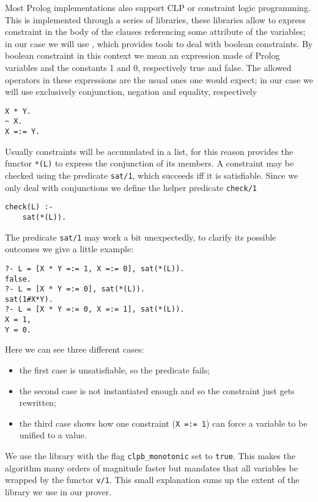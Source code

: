 Most Prolog implementations also support CLP or constraint logic programming.
This is implemented through a series of libraries, these libraries allow to express constraint in the body of the clauses referencing some attribute of the variables;
in our case we will use \CLPB \cite{clpb}, which provides tools to deal with boolean constraints.
By boolean constraint in this context we mean an expression made of Prolog variables and the constants 1 and 0, respectively true and false.
The allowed operators in these expressions are the usual ones one would expect; in our case we will use exclusively conjunction, negation and equality, respectively
\begin{verbatim}
X * Y.
~ X.
X =:= Y.
\end{verbatim}

Usually constraints will be accumulated in a list, for this reason \CLPB{} provides the functor \texttt{*(L)} to express the conjunction of its members.
A constraint may be checked using the predicate \texttt{sat/1}, which succeeds iff it is satisfiable.
Since we only deal with conjunctions we define the helper predicate \texttt{check/1}
\begin{verbatim}
check(L) :-
	sat(*(L)).
\end{verbatim}
The predicate \texttt{sat/1} may work a bit unexpectedly, to clarify its possible outcomes we give a little example:
\begin{verbatim}
?- L = [X * Y =:= 1, X =:= 0], sat(*(L)).
false.
?- L = [X * Y =:= 0], sat(*(L)).
sat(1#X*Y).
?- L = [X * Y =:= 0, X =:= 1], sat(*(L)).
X = 1,
Y = 0.
\end{verbatim}
Here we can see three different cases:
\begin{itemize}
	\item the first case is unsatisfiable, so the predicate fails;
	\item the second case is not instantiated enough and so the constraint just gets rewritten;
	\item the third case shows how one constraint (\texttt{X =:= 1}) can force a variable to be unified to a value.
\end{itemize}
We use the library with the flag \texttt{clpb\_monotonic} set to \texttt{true}.
This makes the algorithm many orders of magnitude faster but mandates that all variables be wrapped by the functor \texttt{v/1}.
This small explanation sums up the extent of the library we use in our prover.
